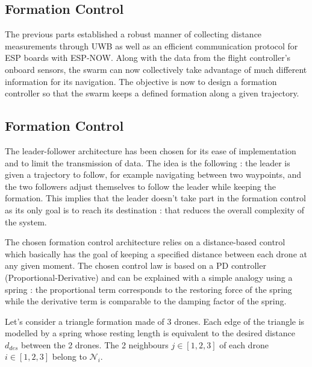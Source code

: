 \documentclass[conference]{IEEEtran}
\begin{document}
\subsection{Formation Control}

The previous parts established a robust manner of collecting distance measurements through UWB as well as an efficient communication protocol for ESP boards with ESP-NOW. Along with the data from the flight controller's onboard sensors, the swarm can now collectively take advantage of much different information for its navigation. The objective is now to design a formation controller so that the swarm keeps a defined formation along a given trajectory.

\subsection{Formation Control}

The leader-follower architecture has been chosen for its ease of implementation and to limit the transmission of data. The idea is the following : the leader is given a trajectory to follow, for example navigating between two waypoints, and the two followers adjust themselves to follow the leader while keeping the formation. This implies that the leader doesn't take part in the formation control as its only goal is to reach its destination : that reduces the overall complexity of the system.


The chosen formation control architecture relies on a distance-based control which basically has the goal of keeping a specified distance between each drone at any given moment. The chosen control law is based on a PD controller (Proportional-Derivative) and can be explained with a simple analogy using a spring : the proportional term corresponds to the restoring force of the spring while the derivative term is comparable to the damping factor of the spring.

Let's consider a triangle formation made of 3 drones. Each edge of the triangle is modelled by a spring whose resting length is equivalent to the desired distance $d_{des}$ between the 2 drones. The 2 neighbours $j\in[1,2,3]$ of each drone $i\in[1,2,3]$ belong to $\mathcal{N}_i$.
\end{document}
